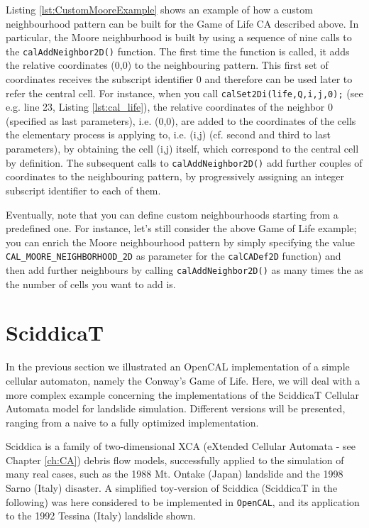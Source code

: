 Listing \ref{lst:CustomMooreExample} shows an example of how a custom
neighbourhood pattern can be built for the Game of Life CA described
above. In particular, the Moore neighburhood is built by using a
sequence of nine calls to the \verb'calAddNeighbor2D()' function. The
first time the function is called, it adds the relative coordinates
(0,0) to the neighbouring pattern. This first set of coordinates
receives the subscript identifier 0 and therefore can be used later to
refer the central cell. For instance, when you call
\verb'calSet2Di(life,Q,i,j,0);' (see e.g. line 23, Listing
\ref{lst:cal_life}), the relative coordinates of the neighbor 0
(specified as last parameters), i.e. (0,0), are added to the
coordinates of the cells the elementary process is applying to,
i.e. (i,j) (cf. second and third to last parameters), by obtaining the
cell (i,j) itself, which correspond to the central cell by
definition. The subsequent calls to \verb'calAddNeighbor2D()' add
further couples of coordinates to the neighbouring pattern, by
progressively assigning an integer subscript identifier to each of
them.

Eventually, note that you can define custom neighbourhoods starting
from a predefined one. For instance, let's still consider the above
Game of Life example; you can enrich the Moore neighbourhood pattern
by simply specifying the value \verb'CAL_MOORE_NEIGHBORHOOD_2D' as
parameter for the \verb'calCADef2D' function) and then add further
neighbours by calling \verb'calAddNeighbor2D()' as many times the as
the number of cells you want to add is.

\section{SciddicaT}\label{sec:sciddicaT}
In the previous section we illustrated an OpenCAL implementation of a
simple cellular automaton, namely the Conway’s Game of Life. Here, we
will deal with a more complex example concerning the implementations
of the SciddicaT Cellular Automata model for landslide
simulation. Different versions will be presented, ranging from a naive
to a fully optimized implementation.

Sciddica is a family of two-dimensional XCA (eXtended Cellular
Automata - see Chapter \ref{ch:CA}) debris flow models, successfully
applied to the simulation of many real cases, such as the 1988
Mt. Ontake (Japan) landslide and the 1998 Sarno (Italy) disaster. A
simplified toy-version of Sciddica (SciddicaT in the following) was
here considered to be implemented in \verb"OpenCAL", and its
application to the 1992 Tessina (Italy) landslide shown.

